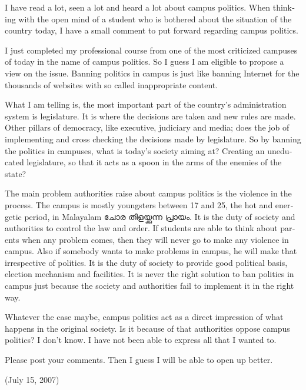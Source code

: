 \enlargethispage*{2\baselineskip}
\begin{english}
I have read a lot, seen a lot and heard a lot about campus politics. 
When thinking with the open mind of a student who is bothered about 
the situation of the country today, I have a small comment to put forward regarding campus politics.

I just completed my professional course from one of the most criticized campuses of 
today in the name of campus politics. So I guess I am eligible to propose a view on the issue. 
Banning politics in campus is just like banning Internet for the thousands of websites with 
so called inappropriate content.

What I am telling is, the most important part of the country’s administration system is legislature. 
It is where the decisions are taken and new rules are made. Other pillars of democracy, 
like executive, judiciary and media; does the job of implementing and cross checking the decisions 
made by legislature. So by banning the politics in campuses, what is today's society aiming at? Creating an 
uneducated legislature, so that it acts as a spoon in the arms of the enemies of the state?

The main problem authorities raise about campus politics is the violence in the process. The campus
is mostly youngsters between 17 and 25, the hot and energetic period, in Malayalam \textmalayalam{ചോര തിളയ്ക്കുന്ന പ്രായം. }
It is the duty of society and authorities to control the law and order. If students are able to think about
parents when any problem comes, then they will never go to make any violence in campus. Also if somebody wants 
to make problems in campus, he will make that irrespective of politics. It is the duty of society to provide good
political basis, election mechanism and facilities. It is never the right solution to ban politics in campus just 
because the society and authorities fail to implement it in the right way. 

Whatever the case maybe, campus politics act as a direct impression of what happens in the original society. 
Is it because of that authorities oppose campus politics? I don’t know. I have not been able to express all that I wanted to. 

Please post your comments. Then I guess I will be able to open up better. 

\begin{flushright}(July 15, 2007)\end{flushright}
\end{english}
\newpage
